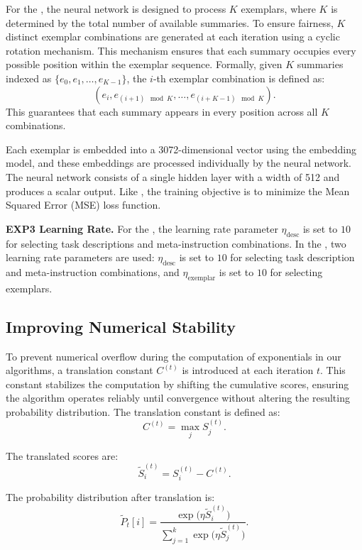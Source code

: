 For the \alges, the neural network is designed to process \(K\) exemplars, where \(K\) is determined by the total number of available summaries. To ensure fairness, \(K\) distinct exemplar combinations are generated at each iteration using a cyclic rotation mechanism. This mechanism ensures that each summary occupies every possible position within the exemplar sequence. Formally, given \(K\) summaries indexed as \(\{e_0, e_1, \dots, e_{K-1}\}\), the \(i\)-th exemplar combination is defined as:
\[
(e_i, e_{(i+1) \mod K}, \dots, e_{(i+K-1) \mod K}).
\]
This guarantees that each summary appears in every position across all \(K\) combinations.

Each exemplar is embedded into a 3072-dimensional vector using the embedding model, and these embeddings are processed individually by the neural network. The neural network consists of a single hidden layer with a width of 512 and produces a scalar output. Like \alg, the training objective is to minimize the Mean Squared Error (MSE) loss function.

\textbf{EXP3 Learning Rate.} 
For the \alg, the learning rate parameter \(\eta_{\text{desc}}\) is set to \(10\) for selecting task descriptions and meta-instruction combinations. In the \alges, two learning rate parameters are used: \(\eta_{\text{desc}}\) is set to \(10\) for selecting task description and meta-instruction combinations, and \(\eta_{\text{exemplar}}\) is set to \(10\) for selecting exemplars.


\subsection{Improving Numerical Stability}

To prevent numerical overflow during the computation of exponentials in our algorithms,
a translation constant \( C^{(t)} \) is introduced at each iteration \( t \). This constant stabilizes the computation by shifting the cumulative scores, ensuring the algorithm operates reliably until convergence without altering the resulting probability distribution. The translation constant is defined as:
\begin{equation}
C^{(t)} = \max_{j} S_j^{(t)}.
\end{equation}

The translated scores are:
\begin{equation}
\tilde{S}_i^{(t)} = S_i^{(t)} - C^{(t)}.
\end{equation}

The probability distribution after translation is:
\begin{equation}
\tilde{P}_t[i] = \frac{\exp\big(\eta \tilde{S}_i^{(t)}\big)}{\sum_{j=1}^k \exp\big(\eta \tilde{S}_j^{(t)}\big)}.
\end{equation}

